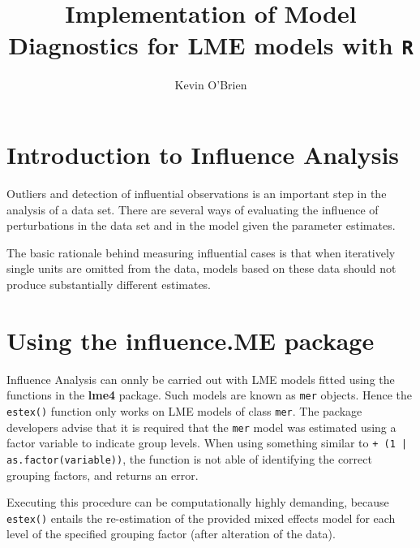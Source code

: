 \documentclass[12pt, a4paper]{article}
\begin{document}
\author{Kevin O'Brien}
\title{Implementation of Model Diagnostics for LME models with \texttt{R}}

\tableofcontents


\section*{Introduction to Influence Analysis}

Outliers and detection of influential observations is an important step in the analysis of a data set. There are several ways of evaluating the influence of perturbations in the data set and in the model given the parameter estimates. 

The basic rationale behind measuring influential cases is that when iteratively single units are omitted
from the data, models based on these data should not produce substantially different estimates.

\section*{Using the influence.ME package}
Influence Analysis can onnly be carried out with LME models fitted using the functions in the \textbf{lme4} package. Such models are known as \texttt{mer} objects.
Hence the \texttt{estex()} function only works on LME
models of class \texttt{mer}.
The package developers advise that it is required that the \texttt{mer} model was estimated using a factor variable to indicate group levels.
When using something similar to \texttt{+ (1 | as.factor(variable))}, the function is not able of
identifying the correct grouping factors, and returns an error.

Executing this procedure can be computationally highly demanding, because \texttt{estex()} entails the re-estimation of the provided mixed effects model for each level of the specified grouping factor (after alteration of the data).
\end{document}
